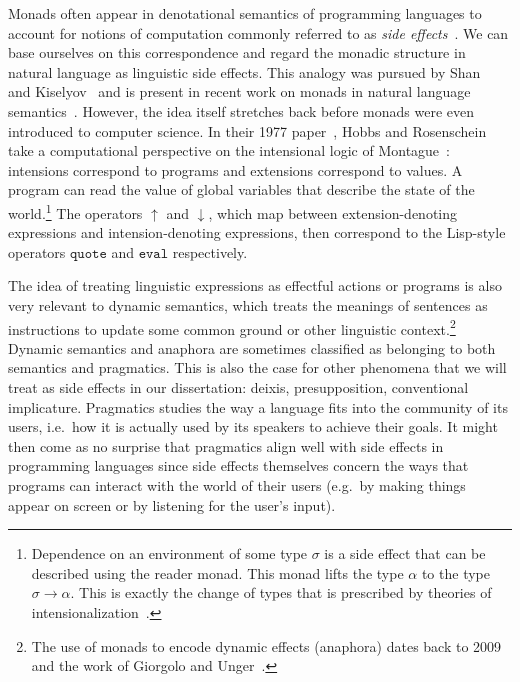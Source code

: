 Monads often appear in denotational semantics of programming languages to
account for notions of computation commonly referred to as \emph{side
  effects}~\cite{moggi1991notions}. We can base ourselves on this
correspondence and regard the monadic structure in natural language as
linguistic side effects. This analogy was pursued by
Shan~\cite{shan2005linguistic,shan2005thesis} and
Kiselyov~\cite{kiselyov2008call} and is present in recent work on monads in
natural language
semantics~\cite{giorgolo2012monads,charlow2014semantics}. However, the idea
itself stretches back before monads were even introduced to computer
science. In their 1977 paper~\cite{hobbs1977making}, Hobbs and Rosenschein
take a computational perspective on the intensional logic of
Montague~\cite{montague1973proper}: intensions correspond to programs and
extensions correspond to values. A program can read the value of global
variables that describe the state of the world.\footnote{Dependence on an
  environment of some type $\sigma$ is a side effect that can be described
  using the reader monad. This monad lifts the type $\alpha$ to the type
  $\sigma \to \alpha$. This is exactly the change of types that is
  prescribed by theories of
  intensionalization~\cite{ben2007semantics,de2013note}.} The operators
$\uparrow$ and $\downarrow$, which map between extension-denoting
expressions and intension-denoting expressions, then correspond to the
Lisp-style operators $\texttt{quote}$ and $\texttt{eval}$ respectively.

The idea of treating linguistic expressions as effectful actions or programs is
also very relevant to dynamic semantics, which treats the meanings of sentences
as instructions to update some common ground or other linguistic
context.\footnote{The use of monads to encode dynamic effects (anaphora) dates
  back to 2009 and the work of Giorgolo and
  Unger~\cite{giorgolo2009coreference,unger2012dynamic}.} Dynamic semantics and
anaphora are sometimes classified as belonging to both semantics and pragmatics.
This is also the case for other phenomena that we will treat as side effects in
our dissertation: deixis, presupposition, conventional implicature. Pragmatics
studies the way a language fits into the community of its users, i.e.\ how it is
actually used by its speakers to achieve their goals. It might then come as no
surprise that pragmatics align well with side effects in programming languages
since side effects themselves concern the ways that programs can interact with
the world of their users (e.g.\ by making things appear on screen or by
listening for the user's input).


